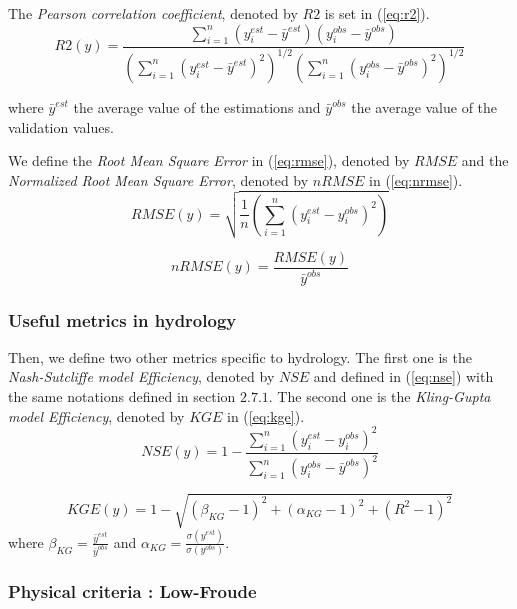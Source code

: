  The \textit{Pearson correlation coefficient}, denoted by $R2$ is set in (\ref{eq:r2}).
\begin{equation}
    R2(y) = \frac{\sum_{i=1}^{n}(y^{est}_i - \bar y^{est}) (y^{obs}_i - \bar y^{obs})} {\left(\sum_{i=1}^{n}(y^{est}_i - \bar y^{est})^2\right)^{1/2}\left(\sum_{i=1}^{n}(y^{obs}_i - \bar y^{obs})^2\right)^{1/2}}
    \label{eq:r2}
\end{equation}

where $\bar y^{est}$ the average value of the estimations and $\bar y^{obs}$ the average value of the validation values. 

We define the \textit{Root Mean Square Error} in (\ref{eq:rmse}), denoted by $RMSE$ and the \textit{Normalized Root Mean Square Error}, denoted by $nRMSE$ in (\ref{eq:nrmse}).
\begin{equation}
    RMSE(y) = \sqrt {\frac{1}{n} \left( \sum^n_{i=1}(y^{est}_i - y^{obs}_i)^2 \right)}
    \label{eq:rmse}
\end{equation}

\begin{equation}
    nRMSE(y) = \frac{RMSE(y)} {\bar y^{obs}}
    \label{eq:nrmse}
\end{equation}

\subsubsection{Useful metrics in hydrology}

Then, we define two other metrics specific to hydrology. The first one is the \textit{Nash-Sutcliffe model Efficiency}, denoted by $NSE$ and defined in (\ref{eq:nse}) with the same notations defined in section $2.7.1$. The second one is the \textit{Kling-Gupta model Efficiency}, denoted by $KGE$ in (\ref{eq:kge}).
\begin{equation}
    NSE(y) = 1 - \frac{\sum^n_{i=1}(y^{est}_i - y^{obs}_i)^2} {\sum^n_{i=1}(y^{obs}_i - \bar y^{obs})^2}
    \label{eq:nse}
\end{equation}


\begin{equation}
    KGE(y) = 1 - \sqrt {(\beta_{KG}-1)^2+(\alpha_{KG}-1)^2+(R^2-1)^2}
    \label{eq:kge}
\end{equation}
where $\beta_{KG}=\frac{\bar y^{est}}{\bar y^{obs}}$ and $\alpha_{KG} = \frac{\sigma(y^{est})}{\sigma(y^{obs})}$.

\subsubsection{Physical criteria : Low-Froude}


